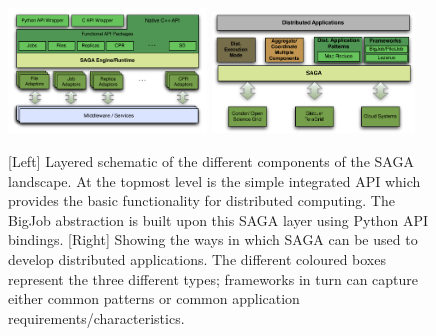 \documentclass{rspublic}
\begin{document}
\begin{figure}[!ht]
 \begin{center}
     \includegraphics[width=0.47\textwidth]{stci_saga_figures-1}
    \includegraphics[width=0.48\textwidth]{distributed_applications_saga_figure}
\end{center}
\caption{\small [Left] Layered schematic of the different components
  of the SAGA landscape. At the topmost level is the simple integrated
  API which provides the basic functionality for distributed
  computing. The BigJob abstraction is built upon this SAGA layer
  using Python API bindings. [Right] Showing the ways in which SAGA
  can be used to develop distributed applications. The different
  coloured boxes represent the three different types; frameworks in turn
  can capture either common patterns or common application
  requirements/characteristics.} \label{Fig:SAGA1}
\end{figure}


\end{document}
